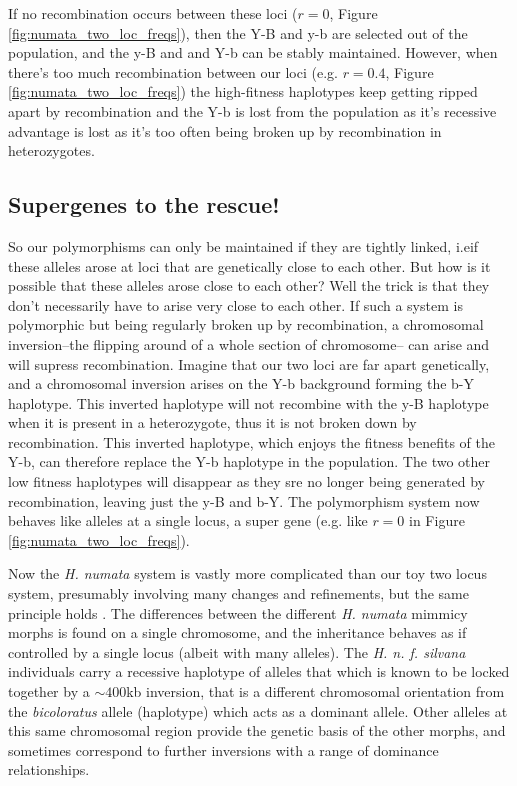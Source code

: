 If no recombination occurs between these loci ($r=0$, Figure \ref{fig:numata_two_loc_freqs}), then the Y-B and y-b are selected out of the population, and the y-B and and  Y-b can be stably maintained. However, when there's too much recombination between our loci (e.g. $r=0.4$, Figure \ref{fig:numata_two_loc_freqs}) the high-fitness haplotypes keep getting ripped apart by recombination and the Y-b is lost from the population as it's recessive advantage is lost as it's too often being broken up by recombination in heterozygotes.

\subsection{Supergenes to the rescue!} \label{Section:super_genes}

So our polymorphisms can only be maintained if they are tightly linked, i.eif these alleles arose at loci that are genetically close to each other. But how is it possible that these alleles arose close to each other? Well the trick is that they don't necessarily have to arise very close to each other. If such a system is polymorphic but being regularly broken up by recombination, a chromosomal inversion--the flipping around of a whole section of chromosome-- can arise and will supress recombination. Imagine that our two loci are far apart genetically, and a chromosomal inversion arises on the Y-b  background forming the b-Y haplotype. This inverted haplotype will not recombine with the y-B haplotype when it is present in a heterozygote, thus it is not broken down by recombination. This inverted haplotype, which enjoys the fitness benefits of the Y-b, can therefore replace the Y-b haplotype in the population. The two other low fitness haplotypes will disappear as they sre no longer being generated by recombination, leaving just the y-B and b-Y. 
  The polymorphism system now behaves like alleles at a single locus, a super gene  (e.g. like $r=0$ in Figure \ref{fig:numata_two_loc_freqs}).

  Now the {\it H. numata} system is vastly more complicated than our toy two locus system, presumably involving many changes and refinements, but the same principle holds \citep{joron2011chromosomal}. The differences between the different {\it H. numata} mimmicy morphs is found on a single chromosome, and the inheritance behaves as if controlled by a single locus (albeit with many alleles).  The {\it H. n. f. silvana} individuals carry a recessive haplotype of alleles that which is known to be locked together by a $\sim 400$kb inversion, that is a different chromosomal orientation from the {\it bicoloratus} allele (haplotype) which acts as a dominant allele. Other alleles at this same chromosomal region provide the genetic basis of the other morphs, and sometimes correspond to further inversions with a range of dominance relationships. 


